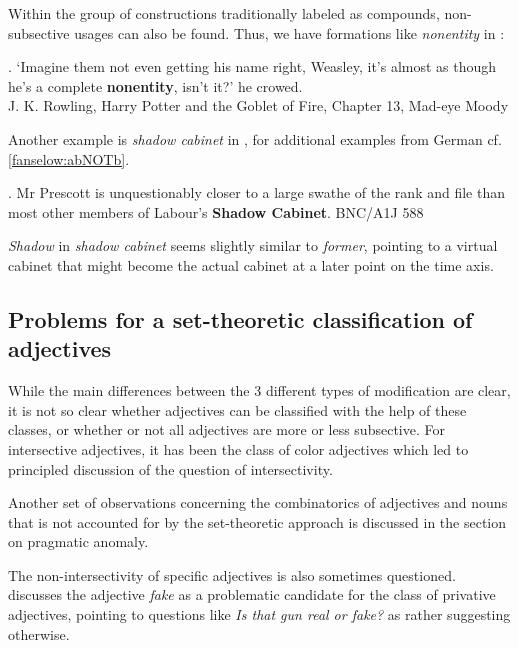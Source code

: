 
Within the group of constructions traditionally labeled as compounds,
non-subsective usages can also be found. Thus, we have formations like
\emph{nonentity} in \Next: %

\ex. `Imagine them not even getting his name right, Weasley, it's almost
as though he's  a complete \textbf{nonentity}, isn't it?' he crowed.\\
J. K. Rowling, Harry Potter and the Goblet of Fire, Chapter 13, Mad-eye Moody
  
Another example is \emph{shadow cabinet} in \Next, for additional examples
from German cf. \ref{fanselow:abNOTb}. 

\ex. Mr Prescott is unquestionably closer to a
         large swathe of the rank and file than most other members of
         Labour's \textbf{Shadow Cabinet}. BNC/A1J 588 	

\emph{Shadow} in \emph{shadow cabinet} seems slightly similar to
\emph{former}, pointing to a virtual cabinet that might become the actual cabinet at a later point on the time axis.
\subsection{Problems for a set-theoretic classification of adjectives}
\label{sec:problems_basic}

While the main differences between the 3 different types of
modification are clear, it is not so clear whether adjectives
can be classified with the help of these classes, or whether or not
all adjectives are more or less subsective. For intersective
adjectives, it has been the class of
color adjectives which
led to principled discussion of the question of intersectivity. 

Another set of observations concerning the combinatorics of adjectives and
nouns that is not accounted for by the set-theoretic approach is
discussed in the section on pragmatic anomaly.

The non-intersectivity of specific adjectives is also sometimes
questioned. \citet[325]{Partee:1995} discusses the adjective \emph{fake} as a problematic
candidate for the class of privative adjectives, pointing to questions like
\emph{Is that gun real or fake?} as rather suggesting otherwise. 

